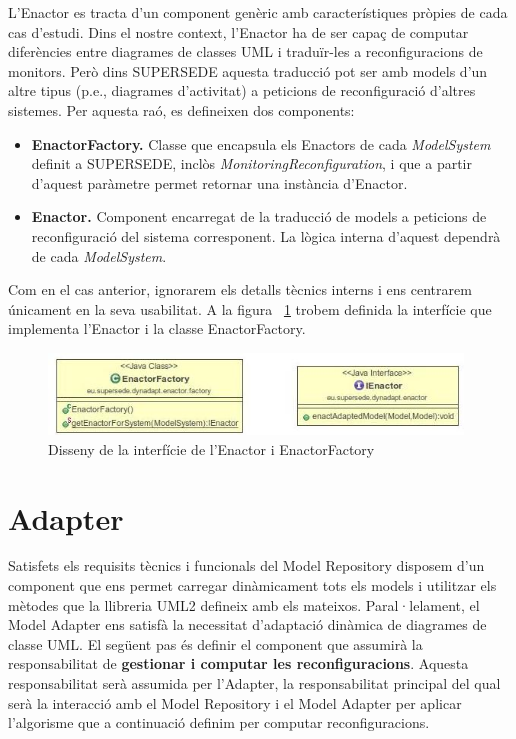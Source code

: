 L'Enactor es tracta d'un component genèric amb característiques pròpies de cada cas d'estudi. Dins el nostre context, l'Enactor ha de ser capaç de computar diferències entre diagrames de classes UML i traduïr-les a reconfiguracions de monitors. Però dins SUPERSEDE aquesta traducció pot ser amb models d'un altre tipus (p.e., diagrames d'activitat) a peticions de reconfiguració d'altres sistemes. Per aquesta raó, es defineixen dos components:

\begin{itemize}
\item \textbf{EnactorFactory.} Classe que encapsula els Enactors de cada \textit{ModelSystem} definit a SUPERSEDE, inclòs \textit{MonitoringReconfiguration}, i que a partir d'aquest paràmetre permet retornar una instància d'Enactor.
\item \textbf{Enactor.} Component encarregat de la traducció de models a peticions de reconfiguració del sistema corresponent. La lògica interna d'aquest dependrà de cada \textit{ModelSystem}.
\end{itemize}

Com en el cas anterior, ignorarem els detalls tècnics interns i ens centrarem únicament en la seva usabilitat. A la figura ~\ref{fig:Figura24} trobem definida la interfície que implementa l'Enactor i la classe EnactorFactory.

\begin{figure}
\centering
\includegraphics[width=11cm]{Figures/Figure24}
\decoRule
\caption{Disseny de la interfície de l'Enactor i EnactorFactory}
\label{fig:Figura24}
\end{figure}

\section{Adapter}

Satisfets els requisits tècnics i funcionals del Model Repository disposem d'un component que ens permet carregar dinàmicament tots els models i utilitzar els mètodes que la llibreria UML2 defineix amb els mateixos. Paral·lelament, el Model Adapter ens satisfà la necessitat d'adaptació dinàmica de diagrames de classe UML. El següent pas és definir el component que assumirà la responsabilitat de \textbf{gestionar i computar les reconfiguracions}. Aquesta responsabilitat serà assumida per l'Adapter, la responsabilitat principal del qual serà la interacció amb el Model Repository i el Model Adapter per aplicar l'algorisme que a continuació definim per computar reconfiguracions.\\

